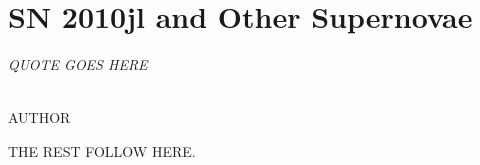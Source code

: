 \chapter{SN 2010jl and Other Supernovae}\label{chp:chp5}

\begin{flushright}
  {\em QUOTE GOES HERE }\\

\ \

\normalsize
{AUTHOR}  
\end{flushright}



THE REST FOLLOW HERE. 


